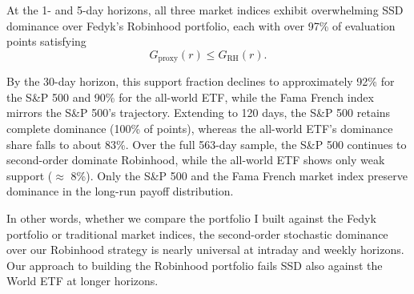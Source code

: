 At the 1- and 5-day horizons, all three market indices exhibit overwhelming SSD dominance over Fedyk's Robinhood portfolio, each with over 97\% of evaluation points satisfying
\begin{equation}
    G_{\mathrm{proxy}}(r) \leq G_{\mathrm{RH}}(r).
\end{equation}

By the 30-day horizon, this support fraction declines to approximately 92\% for the S\&P 500 and 90\% for the all-world ETF, while the Fama French index mirrors the S\&P 500's trajectory. 
Extending to 120 days, the S\&P 500 retains complete dominance (100\% of points), whereas the all-world ETF's dominance share falls to about 83\%. 
Over the full 563-day sample, the S\&P 500 continues to second-order dominate Robinhood, while the all-world ETF shows only weak support ($\approx$ 8\%).
Only the S\&P 500 and the Fama French market index preserve dominance in the long-run payoff distribution.

In other words, whether we compare the portfolio I built against the Fedyk portfolio or traditional market indices, the second-order stochastic dominance over our Robinhood strategy is nearly universal at intraday and weekly horizons. 
Our approach to building the Robinhood portfolio fails SSD also against the World ETF at longer horizons.

